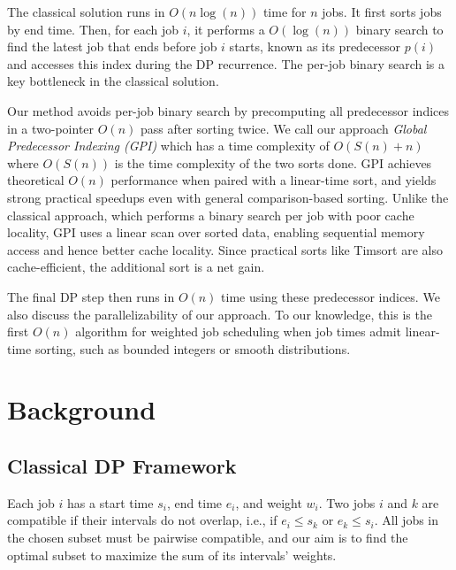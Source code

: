 \documentclass[final,5p,times]{elsarticle}
\begin{document}
The classical solution runs in $O(n \log(n))$ time for $n$ jobs. It first sorts jobs by end time. Then, for each job $i$, it performs a $O(\log(n))$ binary search to find the latest job that ends before job $i$ starts, known as its predecessor $p(i)$ \cite{kleinberg2005} and accesses this index during the DP recurrence. The per-job binary search is a key bottleneck in the classical solution. 

Our method avoids per-job binary search by precomputing all predecessor indices in a two-pointer $O(n)$ pass after sorting twice. We call our approach \emph{Global Predecessor Indexing (GPI)} which has a time complexity of $O(S(n) + n)$ where $O(S(n))$ is the time complexity of the two sorts done. GPI achieves theoretical $O(n)$ performance when paired with a linear-time sort, and yields strong practical speedups even with general comparison-based sorting. Unlike the classical approach, which performs a binary search per job with poor cache locality, GPI uses a linear scan over sorted data, enabling sequential memory access and hence better cache locality. Since practical sorts like Timsort \cite{timsort2002} are also cache-efficient, the additional sort is a net gain.
 
The final DP step then runs in $O(n)$ time using these predecessor indices. We also discuss the parallelizability of our approach. To our knowledge, this is the first $O(n)$ algorithm for weighted job scheduling when job times admit linear-time sorting, such as bounded integers or smooth distributions.

\section{Background}
\label{sec:background}

\subsection{Classical DP Framework}

Each job $i$ has a start time $s_i$, end time $e_i$, and weight $w_i$. Two jobs $i$ and $k$ are compatible if their intervals do not overlap, i.e., if $e_i \leq s_k$ or $e_k \leq s_i$. All jobs in the chosen subset must be pairwise compatible, and our aim is to find the optimal subset to maximize the sum of its intervals' weights.
\end{document}
